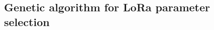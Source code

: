 \documentclass[conference]{../../setup/IEEEtran}
\begin{document}
\begin{refsection}
\chapter[''I know what to do and I go and execute'' - Usain Bolt]{Genetic algorithm for LoRa parameter selection}
	
	
	
	
	
	
% 	
% 	
% 	
% 	
% 	
% 	
% 	
% 	
% 	
% 	
% 	
% 	
% 	
% 	
% 	
% 	
% 	
% 	
% 	
% 	
% 	
% 	
% 	
% 	


\end{refsection}
\end{document}
